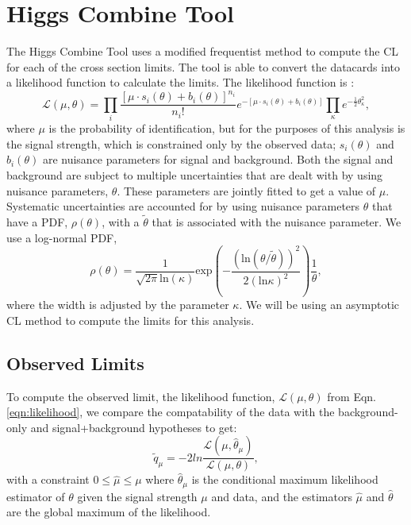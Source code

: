 \section{Higgs Combine Tool}\label{sec:HiggsCombine}

The Higgs Combine Tool \cite{noauthor_procedure_2011} uses a modified frequentist method to compute the CL \cite{read_presentation_2002, junk_confidence_1999, read_modified_2000} for each of the cross section limits. The tool is able to convert the datacards into a likelihood function to calculate the limits. The likelihood function is \cite{noauthor_procedure_2011}:
\begin{equation}\label{eqn:likelihood}
\mathcal{L}(\mu,\theta)=\prod_i \frac{[\mu\cdot s_i(\theta)+b_i(\theta)]^{n_i}}{n_i !}e^{-[\mu\cdot s_i(\theta)+b_i(\theta)]}\prod_\kappa e^{-\frac{1}{2}\theta^2_\kappa},
\end{equation}
where $\mu$ is the probability of identification, but for the purposes of this analysis is the signal strength, which is constrained only by the observed data; $s_i(\theta)$ and $b_i(\theta)$ are nuisance parameters for signal and background. Both the signal and background are subject to multiple uncertainties that are dealt with by using nuisance parameters, $\theta$. These parameters are jointly fitted to get a value of $\mu$. Systematic uncertainties are accounted for by using nuisance parameters $\theta$ that have a PDF, $\rho(\theta)$, with a $\widetilde{\theta}$ that is associated with the nuisance parameter. We use a log-normal \cite{noauthor_procedure_2011} PDF, 
\begin{equation}\label{eqn:lognormal}
\rho(\theta)=\frac{1}{\sqrt{2\pi}\text{ln}(\kappa)}\text{exp}\left(-\frac{(\text{ln}(\theta/\widetilde{\theta}))^2}{2(\text{ln}\kappa)^2}\right)\frac{1}{\theta},
\end{equation}
where the width is adjusted by the parameter $\kappa$. We will be using an asymptotic CL method to compute the limits for this analysis. 

\subsection{Observed Limits}\label{sec:ObsLimits}

To compute the observed limit, the likelihood function, $\mathcal{L}(\mu,\theta)$ from Eqn. \ref{eqn:likelihood}, we compare the compatability of the data with the background-only and signal+background hypotheses to get:
\begin{equation}
\widetilde{q}_\mu=-2 ln\frac{\mathcal{L}(\mu,\hat{\theta}_\mu)}{\mathcal{L}(\mu,\theta)},
\end{equation}
with a constraint $0\leq\hat{\mu}\leq\mu$ where $\hat{\theta}_\mu$ is the conditional maximum likelihood estimator of $\theta$ given the signal strength $\mu$ and data, and the estimators $\hat{\mu}$ and $\hat{\theta}$ are the global maximum of the likelihood. 

